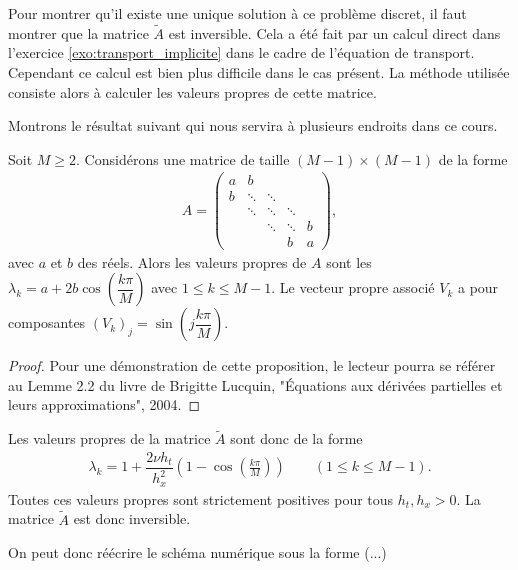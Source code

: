 \documentclass[12pt,a4paper,twoside]{article}
\begin{document}
Pour montrer qu'il existe une unique solution \`a ce probl\`eme discret,
il faut montrer que la matrice $\widetilde{A}$ est inversible.
Cela a \'et\'e fait par un calcul direct dans l'exercice \ref{exo:transport_implicite}
dans le cadre de l'\'equation de transport.
Cependant ce calcul est bien plus difficile dans le cas pr\'esent.
La m\'ethode utilis\'ee consiste alors \`a calculer les valeurs propres de cette matrice.

Montrons le r\'esultat suivant qui nous servira \`a plusieurs endroits dans ce cours.
\begin{proposition}
  Soit $M \geq 2$.
  Consid\'erons une matrice de taille $(M-1) \times (M-1)$ de la forme 
  \begin{align*}
    A = 
    \begin{pmatrix}
      a & b 
      \\
      b & \ddots & \ddots
      \\
      & \ddots & \ddots & \ddots 
      \\
      &&\ddots & \ddots & b
      \\
      &&& b & a
    \end{pmatrix} ,
  \end{align*}
  avec $a$ et $b$ des r\'eels.
  Alors les valeurs propres de $A$ sont les 
  $\lambda_k = a + 2b \cos \left( \dfrac{k \pi}{M} \right)$ avec $1 \leq k \leq M-1$.
  Le vecteur propre associ\'e $V_k$ a pour composantes 
  $(V_k)_j = \sin \left( j \dfrac{k \pi}{M} \right)$.
\end{proposition}

\begin{proof}
  Pour une d\'emonstration de cette proposition, le lecteur pourra se r\'ef\'erer au 
  Lemme 2.2 du livre 
  de Brigitte Lucquin, "\'Equations aux d\'eriv\'ees partielles et leurs approximations", 2004.
\end{proof}

Les valeurs propres de la matrice $\widetilde{A}$ sont donc de la forme
\begin{align*}
  \lambda_k = 1 + \dfrac{2 \nu h_t}{h_x^2} \left(1 - \cos \left(\frac{k \pi}{M} \right) \right)
  \qquad (1 \leq k \leq M-1) .
\end{align*}
Toutes ces valeurs propres sont strictement positives pour tous $h_t , h_x > 0$. 
La matrice $\widetilde{A}$ est donc inversible.


On peut donc r\'e\'ecrire le sch\'ema num\'erique sous la forme
(...)
\end{document}

